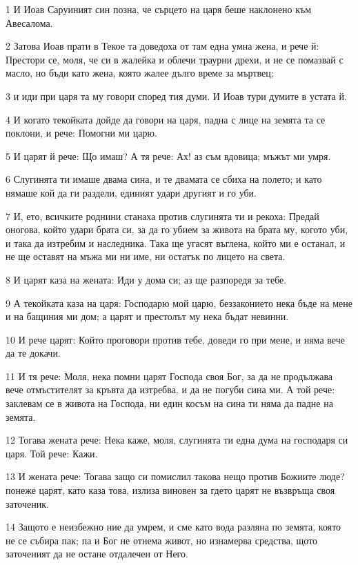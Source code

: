 \par 1 И Иоав Саруиният син позна, че сърцето на царя беше наклонено към Авесалома.
\par 2 Затова Иоав прати в Текое та доведоха от там една умна жена, и рече й: Престори се, моля, че си в жалейка и облечи траурни дрехи, и не се помазвай с масло, но бъди като жена, която жалее дълго време за мъртвец;
\par 3 и иди при царя та му говори според тия думи. И Иоав тури думите в устата й.
\par 4 И когато текойката дойде да говори на царя, падна с лице на земята та се поклони, и рече: Помогни ми царю.
\par 5 И царят й рече: Що имаш? А тя рече: Ах! аз съм вдовица; мъжът ми умря.
\par 6 Слугинята ти имаше двама сина, и те двамата се сбиха на полето; и като нямаше кой да ги раздели, единият удари другият и го уби.
\par 7 И, ето, всичките роднини станаха против слугинята ти и рекоха: Предай оногова, който удари брата си, за да го убием за живота на брата му, когото уби, и така да изтребим и наследника. Така ще угасят въглена, който ми е останал, и не ще оставят на мъжа ми ни име, ни остатък по лицето на света.
\par 8 И царят каза на жената: Иди у дома си; аз ще разпоредя за тебе.
\par 9 А текойката каза на царя: Господарю мой царю, беззаконието нека бъде на мене и на бащиния ми дом; а царят и престолът му нека бъдат невинни.
\par 10 И рече царят: Който проговори против тебе, доведи го при мене, и няма вече да те докачи.
\par 11 И тя рече: Моля, нека помни царят Господа своя Бог, за да не продължава вече отмъстителят за кръвта да изтребва, и да не погуби сина ми. А той рече: заклевам се в живота на Господа, ни един косъм на сина ти няма да падне на земята.
\par 12 Тогава жената рече: Нека каже, моля, слугинята ти една дума на господаря си царя. Той рече: Кажи.
\par 13 И жената рече: Тогава защо си помислил такова нещо против Божиите люде? понеже царят, като каза това, излиза виновен за гдето царят не възвръща своя заточеник.
\par 14 Защото е неизбежно ние да умрем, и сме като вода разляна по земята, която не се събира пак; па и Бог не отнема живот, но изнамерва средства, щото заточеният да не остане отдалечен от Него.
